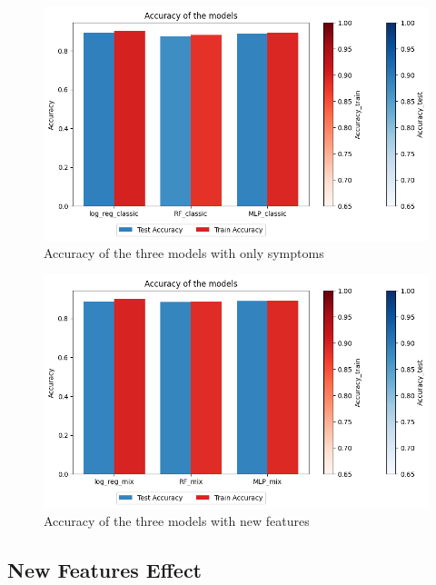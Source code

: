 \begin{figure}[H]
	\centering
	\includegraphics[width=\columnwidth]{images/acc_symptoms.png}
	\caption{Accuracy of the three models with only symptoms}
	\label{fig:acc_symptoms}
\end{figure}

\begin{figure}[H]
	\centering
	\includegraphics[width=\columnwidth]{images/acc_new_features.png}
	\caption{Accuracy of the three models with new features}
	\label{fig:acc_new_features}
\end{figure}




\subsection{New Features Effect}

